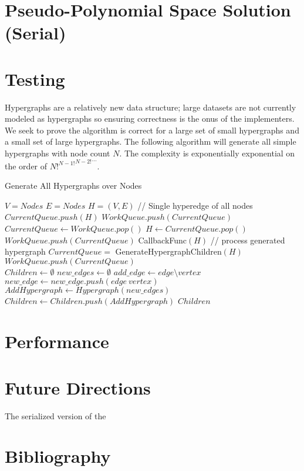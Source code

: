 \documentclass[10pt]{article}
\begin{document}
\section{Pseudo-Polynomial Space Solution (Serial)}

\newpage
\section{Testing}
Hypergraphs are a relatively new data structure; large datasets are not currently modeled as hypergraphs so ensuring correctness is the onus of the implementers. We seek to prove the algorithm is correct for a large set of small hypergraphs and a small set of large hypergraphs. The following algorithm will generate all simple hypergraphs with node count $N$. The complexity is exponentially exponential on the order of ${{{N!}^{N-1!}}^{N-2!}}^{...}$. 
\begin{algorithm}
	\caption{Generate All Hypergraphs over Nodes}\label{euclid}
	\begin{algorithmic}[1]
		\State $V = {Nodes}$
		\State $E = {Nodes}$
		\State $H = (V,E)$ // Single hyperedge of all nodes
		\State $CurrentQueue.push(H)$
		\State $WorkQueue.push(CurrentQueue)$
		\State $CurrentQueue \gets WorkQueue.pop()$
		\State $H \gets CurrentQueue.pop()$
		\State  $WorkQueue.push(CurrentQueue)$
		\EndIf
		\State CallbackFunc$(H)$ // process generated hypergraph
		\State $CurrentQueue = $ GenerateHypergraphChildren$(H)$
		\State  $WorkQueue.push(CurrentQueue)$
		\EndIf
		\EndWhile
		\EndFunction
		\\
		\State $Children \gets \emptyset$
		\State $new\_edges \gets \emptyset$
		\State $add\_edge \gets edge \setminus vertex$
		\State $new\_edge \gets new\_edge.push( edge \ vertex)$
		\EndIf
		\EndFor
		\State $AddHypergraph \gets Hypergraph(new\_edges)$
		\State $Children \gets Children.push(AddHypergraph)$
		\EndFor
		\State \Return $Children$
		\EndFunction
	\end{algorithmic}
\end{algorithm}

\section{Performance}

\section{Future Directions}
The serialized version of the


\newpage
\section{Bibliography}
\nocite{*}


\end{document}
